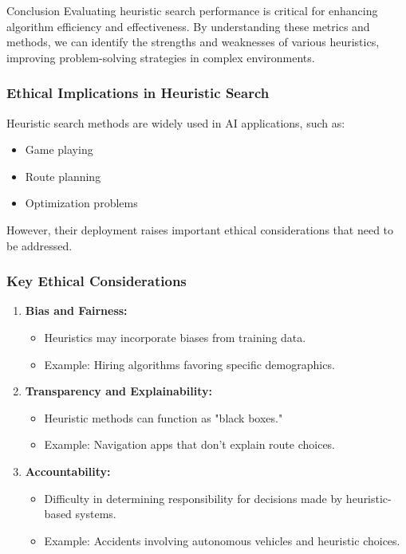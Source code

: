 \documentclass[aspectratio=169]{beamer}
\begin{document}
\begin{frame}[fragile]{Conclusion}
    Evaluating heuristic search performance is critical for enhancing algorithm efficiency and effectiveness. 
    By understanding these metrics and methods, we can identify the strengths and weaknesses of various heuristics, improving problem-solving strategies in complex environments.
\end{frame}

\begin{frame}[fragile]
    \frametitle{Ethical Implications in Heuristic Search}
    Heuristic search methods are widely used in AI applications, such as:
    \begin{itemize}
        \item Game playing
        \item Route planning
        \item Optimization problems
    \end{itemize}
    However, their deployment raises important ethical considerations that need to be addressed.
\end{frame}

\begin{frame}[fragile]
    \frametitle{Key Ethical Considerations}
    \begin{enumerate}
        \item \textbf{Bias and Fairness:}
            \begin{itemize}
                \item Heuristics may incorporate biases from training data.
                \item Example: Hiring algorithms favoring specific demographics.
            \end{itemize}
        
        \item \textbf{Transparency and Explainability:}
            \begin{itemize}
                \item Heuristic methods can function as "black boxes."
                \item Example: Navigation apps that don’t explain route choices.
            \end{itemize}
        
        \item \textbf{Accountability:}
            \begin{itemize}
                \item Difficulty in determining responsibility for decisions made by heuristic-based systems.
                \item Example: Accidents involving autonomous vehicles and heuristic choices.
            \end{itemize}
    \end{enumerate}
\end{frame}
\end{document}
